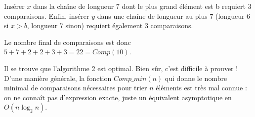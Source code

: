 Insérer $x$ dans la chaîne de longueur 7 dont le plus grand élément est b requiert 3 comparaisons. Enfin, insérer $y$ dans une chaîne de longueur au plus 7 (longueur 6 si $x>b$, longueur 7 sinon) requiert également 3 comparaisons.
\medskip

Le nombre final de comparaisons est donc $5+7+2+2+3+3=22=Comp(10)$.
\medskip

Il se trouve que l'algorithme 2 est optimal. Bien sûr, c'est difficile à prouver ! D'une manière générale, la fonction $Comp\_min(n)$ qui donne le nombre minimal de comparaisons nécessaires pour trier $n$ éléments est très mal connue : on ne connaît pas d'expression exacte, juste un équivalent asymptotique en $O(n\log_2n)$.
\bigskip

\Fin
